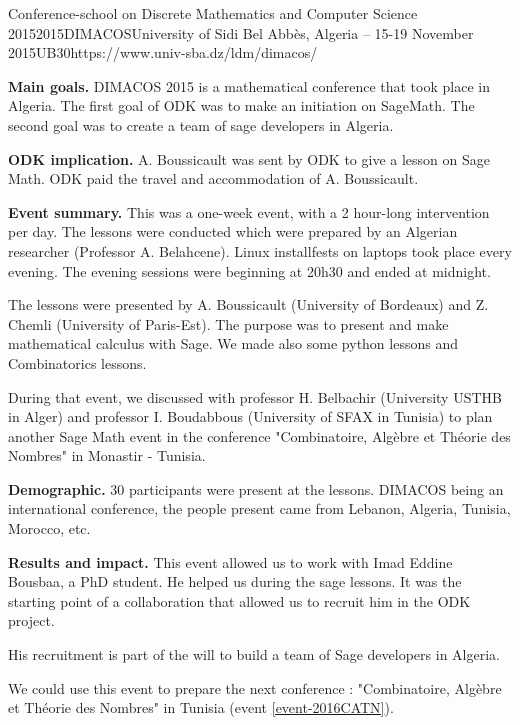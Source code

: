 \begin{event}{Conference-school on Discrete Mathematics and Computer Science 2015}{2015DIMACOS}{University of Sidi Bel Abbès, Algeria -- 15-19 November 2015}{UB}{30}{https://www.univ-sba.dz/ldm/dimacos/}

\textbf{Main goals.} DIMACOS 2015 is a mathematical conference that took place in 
Algeria. The first goal of ODK was to make an initiation on SageMath. 
The second goal was to create a team of sage developers in Algeria.

\textbf{ODK implication.} A. Boussicault was sent by ODK to give a lesson on
Sage Math. ODK paid the travel and accommodation of A. Boussicault.

\textbf{Event summary.}
This was a one-week event, with a 2 hour-long intervention per day.
The lessons were conducted which were prepared by 
an Algerian researcher (Professor A. Belahcene).
Linux installfests on laptops took place every evening. 
The evening sessions were beginning at 20h30 and ended at midnight.

The lessons were presented by A. Boussicault (University of Bordeaux) and 
Z. Chemli (University of Paris-Est). The purpose was to present and make 
mathematical calculus with Sage. We made also some python lessons and 
Combinatorics lessons.

During that event, we discussed with professor H. Belbachir 
(University USTHB in Alger) and professor I. Boudabbous 
(University of SFAX in Tunisia) to plan another Sage Math event in the 
conference "Combinatoire, Algèbre et Théorie des Nombres" 
in Monastir - Tunisia. 


\textbf{Demographic.} 30 participants were present at the lessons. 
DIMACOS being an international conference, the people present came from Lebanon, Algeria, Tunisia, Morocco, etc.

\textbf{Results and impact.} 
This event allowed us to work with Imad Eddine Bousbaa, a PhD student. 
He helped us during the sage lessons.
It was the starting point of a collaboration that allowed us to recruit him in
the ODK project.

His recruitment is part of the will to build a team of Sage developers in Algeria.

We could use this event to prepare the next conference : "Combinatoire, Algèbre et Théorie des Nombres"
in Tunisia (event \ref{event-2016CATN}).


\end{event}
